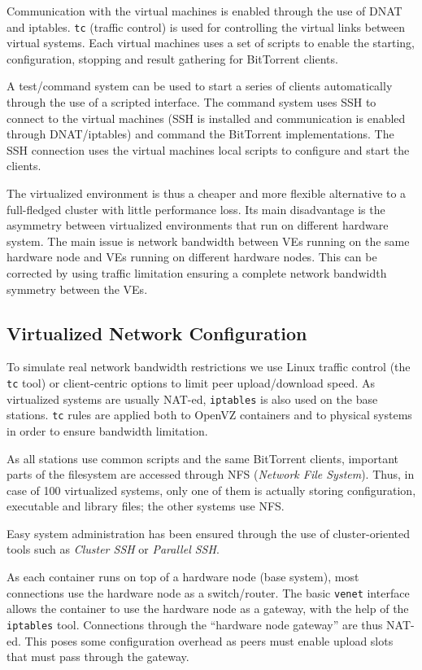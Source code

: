 Communication with the virtual machines is enabled through the use of DNAT and
iptables. \texttt{tc} (traffic control) is used for controlling the virtual
links between virtual systems. Each virtual machines uses a set of scripts to
enable the starting, configuration, stopping and result gathering for
BitTorrent clients.

A test/command system can be used to start a series of clients automatically
through the use of a scripted interface. The command system uses SSH to
connect to the virtual machines (SSH is installed and communication is enabled
through DNAT/iptables) and command the BitTorrent implementations. The SSH
connection uses the virtual machines local scripts to configure and start the
clients.

The virtualized environment is thus a cheaper and more flexible alternative to
a full-fledged cluster with little performance loss. Its main disadvantage is
the asymmetry between virtualized environments that run on different hardware
system. The main issue is network bandwidth between VEs running on the same
hardware node and VEs running on different hardware nodes. This can be
corrected by using traffic limitation ensuring a complete network bandwidth
symmetry between the VEs.

\subsection{Virtualized Network Configuration}
\label{sec:virt-netconf}

To simulate real network bandwidth restrictions we use Linux traffic control
(the \texttt{tc} tool) or client-centric options to limit peer upload/download
speed. As virtualized systems are usually NAT-ed, \texttt{iptables} is also
used on the base stations. \texttt{tc} rules are applied both to OpenVZ
containers and to physical systems in order to ensure bandwidth limitation.

As all stations use common scripts and the same BitTorrent clients, important
parts of the filesystem are accessed through NFS (\textit{Network File
System}). Thus, in case of 100 virtualized systems, only one of them is
actually storing configuration, executable and library files; the other
systems use NFS.

Easy system administration has been ensured through the use of
cluster-oriented tools such as \textit{Cluster SSH} or \textit{Parallel SSH}.

As each container runs on top of a hardware node (base system), most
connections use the hardware node as a switch/router. The basic \texttt{venet}
interface allows the container to use the hardware node as a gateway, with the
help of the \texttt{iptables} tool. Connections through the ``hardware node
gateway'' are thus NAT-ed. This poses some configuration overhead as peers
must enable upload slots that must pass through the gateway.

